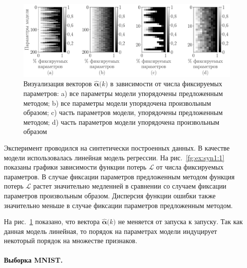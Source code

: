 \begin{figure}[h!t]\center
\includegraphics[width=1\textwidth]{results/order/generate_data_linear_matshow}
\caption{Визуализация векторов $\hat{\bm{\alpha}}\bigr(k\bigr)$ в зависимости от числа фиксируемых параметров: a) все параметры модели упорядочены предложенным методом; b) все параметры модели упорядочена произвольным образом; c) часть параметров модели, упорядочены предложенным методом; d) часть параметров модели упорядочена произвольным образом}
\label{fg:ex:syn1:2}
\end{figure}

Эксперимент проводился на синтетически построенных данных. В качестве модели использовалась линейная модель регрессии.
На рис.~\ref{fg:ex:syn1:1} показаны графики зависимости функции потерь $\mathcal{L}$ от числа фиксируемых параметров. В случае фиксации параметров предложенным методом функция потерь $\mathcal{L}$ растет значительно медленней в сравнении со случаем фиксации параметров произвольным образом. Дисперсия функции ошибки также значительно меньше в случае фиксации параметров предложенным методом.

На рис.~\ref{fg:ex:syn1:2} показано, что вектора $\hat{\bm{\alpha}}\bigr(k\bigr)$ не меняется от запуска к запуску. Так как данная модель линейная, то порядок на параметрах модели индуцирует некоторый порядок на множестве признаков.

\paragraph{Выборка MNIST.}

